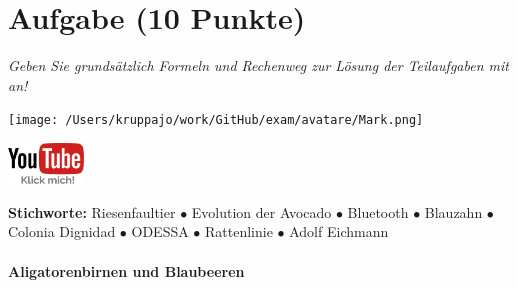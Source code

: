 \documentclass[a4paper, 9pt]{scrartcl}\usepackage[]{graphicx}\usepackage[]{xcolor}
\begin{document}
 
\clearpage

\section{Aufgabe \hfill (10 Punkte)}

\textit{Geben Sie grundsätzlich Formeln und Rechenweg zur Lösung der Teilaufgaben mit an!} \\[1Ex]
 

 
\ifcollection
\begin{flushright}
\tiny\vspace{-3Ex}
\textbf{\examinhaltstart}
\exammodulemathstat
\vspace{-4Ex}
\end{flushright}
\begin{minipage}[t]{0.5\textwidth}
\texttt{[image: /Users/kruppajo/work/GitHub/exam/avatare/Mark.png]}
\end{minipage}
\begin{minipage}[t]{0.5\textwidth}
\hfill
\href{https://youtu.be/https://youtu.be/k2G52hMIfqk}{\includegraphics[width = 2cm]{img/youtube}}
\end{minipage}
\fi

{\tiny\textbf{Stichworte:} Riesenfaultier $\bullet$ Evolution der Avocado $\bullet$ Bluetooth $ \bullet$ Blauzahn $\bullet$ Colonia Dignidad $\bullet$ ODESSA $\bullet$ Rattenlinie $\bullet$ Adolf Eichmann}



\ifcollection
\paragraph{Aligatorenbirnen und Blaubeeren}
\fi
\end{document}
